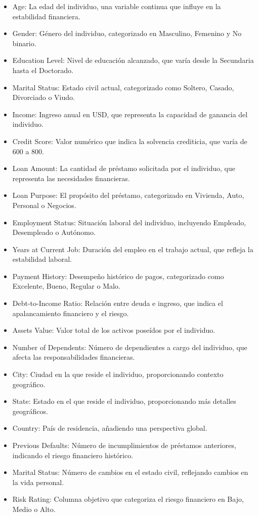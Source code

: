 \documentclass[
  letterpaper,
  DIV=11,
  numbers=noendperiod]{scrreprt}
\begin{document}
\begin{itemize}
\item
  Age: La edad del individuo, una variable continua que influye en la
  estabilidad financiera.
\item
  Gender: Género del individuo, categorizado en Masculino, Femenino y No
  binario.
\item
  Education Level: Nivel de educación alcanzado, que varía desde la
  Secundaria hasta el Doctorado.
\item
  Marital Status: Estado civil actual, categorizado como Soltero,
  Casado, Divorciado o Viudo.
\item
  Income: Ingreso anual en USD, que representa la capacidad de ganancia
  del individuo.
\item
  Credit Score: Valor numérico que indica la solvencia crediticia, que
  varía de 600 a 800.
\item
  Loan Amount: La cantidad de préstamo solicitada por el individuo, que
  representa las necesidades financieras.
\item
  Loan Purpose: El propósito del préstamo, categorizado en Vivienda,
  Auto, Personal o Negocios.
\item
  Employment Status: Situación laboral del individuo, incluyendo
  Empleado, Desempleado o Autónomo.
\item
  Years at Current Job: Duración del empleo en el trabajo actual, que
  refleja la estabilidad laboral.
\item
  Payment History: Desempeño histórico de pagos, categorizado como
  Excelente, Bueno, Regular o Malo.
\item
  Debt-to-Income Ratio: Relación entre deuda e ingreso, que indica el
  apalancamiento financiero y el riesgo.
\item
  Assets Value: Valor total de los activos poseídos por el individuo.
\item
  Number of Dependents: Número de dependientes a cargo del individuo,
  que afecta las responsabilidades financieras.
\item
  City: Ciudad en la que reside el individuo, proporcionando contexto
  geográfico.
\item
  State: Estado en el que reside el individuo, proporcionando más
  detalles geográficos.
\item
  Country: País de residencia, añadiendo una perspectiva global.
\item
  Previous Defaults: Número de incumplimientos de préstamos anteriores,
  indicando el riesgo financiero histórico.
\item
  Marital Status: Número de cambios en el estado civil, reflejando
  cambios en la vida personal.
\item
  Risk Rating: Columna objetivo que categoriza el riesgo financiero en
  Bajo, Medio o Alto.
\end{itemize}
\end{document}
